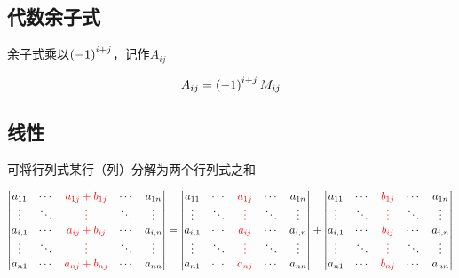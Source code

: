 \documentclass{article}
\begin{document}
\subsection{代数余子式}

余子式乘以$\left(-1\right)^{i+j}$，记作$A_{ij}$

\[A_{ij}=\left(-1\right)^{i+j}M_{ij}\]

\subsection{线性}

可将行列式某行（列）分解为两个行列式之和

\[\begin{vmatrix}
        a_{11}  & \cdots & \color{red}{a_{1j}+b_{1j}} & \cdots & a_{1n}  \\
        \vdots  & \ddots & \color{red}{\vdots}        & \ddots & \vdots  \\
        a_{i,1} & \cdots & \color{red}{a_{ij}+b_{ij}} & \cdots & a_{i,n} \\
        \vdots  & \ddots & \color{red}{\vdots}        & \ddots & \vdots  \\
        a_{n1}  & \cdots & \color{red}{a_{nj}+b_{nj}} & \cdots & a_{nn}  \\
    \end{vmatrix}=
    \begin{vmatrix}
        a_{11}  & \cdots & \color{red}{a_{1j}} & \cdots & a_{1n}  \\
        \vdots  & \ddots & \color{red}{\vdots} & \ddots & \vdots  \\
        a_{i,1} & \cdots & \color{red}{a_{ij}} & \cdots & a_{i,n} \\
        \vdots  & \ddots & \color{red}{\vdots} & \ddots & \vdots  \\
        a_{n1}  & \cdots & \color{red}{a_{nj}} & \cdots & a_{nn}  \\
    \end{vmatrix}+
    \begin{vmatrix}
        a_{11}  & \cdots & \color{red}{b_{1j}} & \cdots & a_{1n}  \\
        \vdots  & \ddots & \color{red}{\vdots} & \ddots & \vdots  \\
        a_{i,1} & \cdots & \color{red}{b_{ij}} & \cdots & a_{i,n} \\
        \vdots  & \ddots & \color{red}{\vdots} & \ddots & \vdots  \\
        a_{n1}  & \cdots & \color{red}{b_{nj}} & \cdots & a_{nn}  \\
    \end{vmatrix}\]
\end{document}
